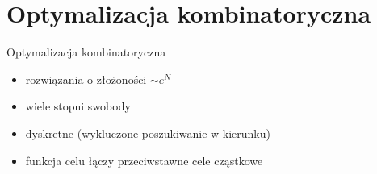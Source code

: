 \section{Optymalizacja kombinatoryczna}




	\begin{frame}{Optymalizacja kombinatoryczna}
			\begin{itemize}
				\item rozwiązania o złożoności $\sim e^N$
				\item wiele stopni swobody
				\item dyskretne (wykluczone poszukiwanie w kierunku)
				\item funkcja celu  łączy przeciwstawne cele cząstkowe
			\end{itemize}
	\end{frame}

